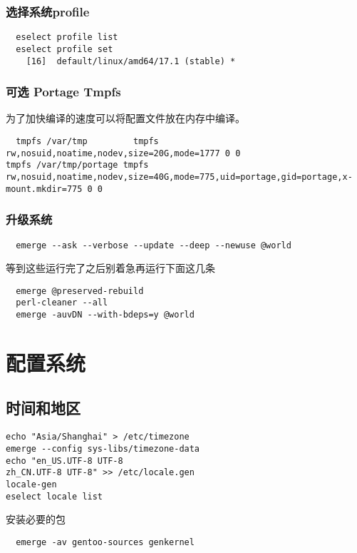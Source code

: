 \documentclass{book}
\begin{document}
\subsection{选择系统profile}
\begin{lstlisting}
  eselect profile list
  eselect profile set
    [16]  default/linux/amd64/17.1 (stable) *
\end{lstlisting}
\subsection{可选 Portage Tmpfs}
为了加快编译的速度可以将配置文件放在内存中编译。
\begin{lstlisting}
  tmpfs /var/tmp         tmpfs rw,nosuid,noatime,nodev,size=20G,mode=1777 0 0
tmpfs /var/tmp/portage tmpfs rw,nosuid,noatime,nodev,size=40G,mode=775,uid=portage,gid=portage,x-mount.mkdir=775 0 0
\end{lstlisting}


\subsection{升级系统}
\begin{lstlisting}
  emerge --ask --verbose --update --deep --newuse @world
\end{lstlisting}

等到这些运行完了之后别着急再运行下面这几条
\begin{lstlisting}
  emerge @preserved-rebuild
  perl-cleaner --all
  emerge -auvDN --with-bdeps=y @world
\end{lstlisting}

\chapter{配置系统}


\section{时间和地区}
\begin{lstlisting}
echo "Asia/Shanghai" > /etc/timezone
emerge --config sys-libs/timezone-data
echo "en_US.UTF-8 UTF-8
zh_CN.UTF-8 UTF-8" >> /etc/locale.gen
locale-gen
eselect locale list

\end{lstlisting}

安装必要的包

\begin{lstlisting}
  emerge -av gentoo-sources genkernel 
\end{lstlisting}
\end{document}
